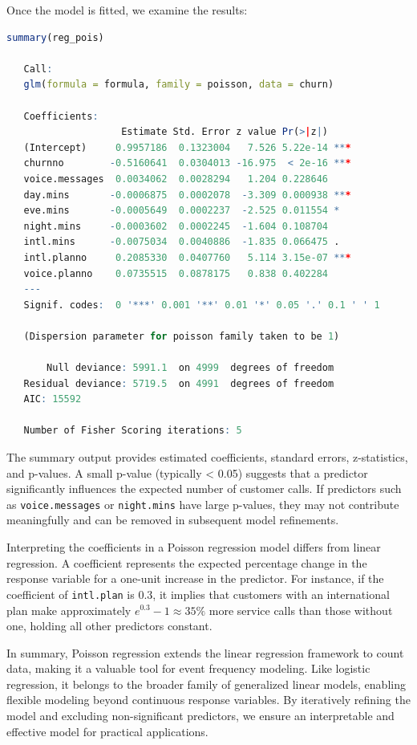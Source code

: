 \documentclass[
  11pt,
]{book}
\newcommand{\passthrough}[1]{#1}
\theoremstyle{definition}
\theoremstyle{definition}
\theoremstyle{definition}
\theoremstyle{definition}
\theoremstyle{remark}
\begin{document}
Once the model is fitted, we examine the results:

\begin{lstlisting}[language=R]
summary(reg_pois)
   
   Call:
   glm(formula = formula, family = poisson, data = churn)
   
   Coefficients:
                    Estimate Std. Error z value Pr(>|z|)    
   (Intercept)     0.9957186  0.1323004   7.526 5.22e-14 ***
   churnno        -0.5160641  0.0304013 -16.975  < 2e-16 ***
   voice.messages  0.0034062  0.0028294   1.204 0.228646    
   day.mins       -0.0006875  0.0002078  -3.309 0.000938 ***
   eve.mins       -0.0005649  0.0002237  -2.525 0.011554 *  
   night.mins     -0.0003602  0.0002245  -1.604 0.108704    
   intl.mins      -0.0075034  0.0040886  -1.835 0.066475 .  
   intl.planno     0.2085330  0.0407760   5.114 3.15e-07 ***
   voice.planno    0.0735515  0.0878175   0.838 0.402284    
   ---
   Signif. codes:  0 '***' 0.001 '**' 0.01 '*' 0.05 '.' 0.1 ' ' 1
   
   (Dispersion parameter for poisson family taken to be 1)
   
       Null deviance: 5991.1  on 4999  degrees of freedom
   Residual deviance: 5719.5  on 4991  degrees of freedom
   AIC: 15592
   
   Number of Fisher Scoring iterations: 5
\end{lstlisting}

The summary output provides estimated coefficients, standard errors, z-statistics, and p-values. A small p-value (typically \textless{} 0.05) suggests that a predictor significantly influences the expected number of customer calls. If predictors such as \passthrough{\lstinline!voice.messages!} or \passthrough{\lstinline!night.mins!} have large p-values, they may not contribute meaningfully and can be removed in subsequent model refinements.

Interpreting the coefficients in a Poisson regression model differs from linear regression. A coefficient represents the expected percentage change in the response variable for a one-unit increase in the predictor. For instance, if the coefficient of \passthrough{\lstinline!intl.plan!} is 0.3, it implies that customers with an international plan make approximately \(e^{0.3} - 1 \approx 35\%\) more service calls than those without one, holding all other predictors constant.

In summary, Poisson regression extends the linear regression framework to count data, making it a valuable tool for event frequency modeling. Like logistic regression, it belongs to the broader family of generalized linear models, enabling flexible modeling beyond continuous response variables. By iteratively refining the model and excluding non-significant predictors, we ensure an interpretable and effective model for practical applications.
\end{document}
